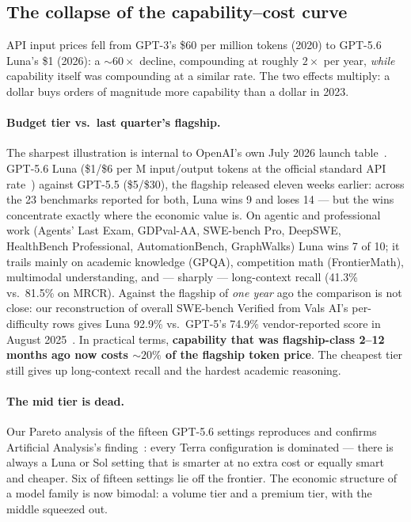 \documentclass[11pt]{article}
\begin{document}
\subsection{The collapse of the capability--cost curve}\label{sec:cost}

API input prices fell from GPT-3's \$60 per million tokens (2020) to GPT-5.6
Luna's \$1 (2026): a ${\sim}60\times$ decline,
compounding at roughly $2\times$ per year, \emph{while} capability itself
was compounding at a similar rate. The two effects multiply: a dollar buys
orders of magnitude more capability than a dollar in 2023.

\paragraph{Budget tier vs.\ last quarter's flagship.} The sharpest illustration
is internal to OpenAI's own July 2026 launch table~\cite{openai2026gpt56}.
GPT-5.6 Luna (\$1/\$6 per M input/output tokens at the official standard API
rate~\cite{openai2026gpt56}) against GPT-5.5 (\$5/\$30), the flagship released
eleven weeks earlier: across the 23 benchmarks reported for both, Luna wins 9
and loses 14 --- but the wins concentrate exactly where the economic value is.
On agentic and professional work (Agents' Last Exam, GDPval-AA, SWE-bench Pro,
DeepSWE, HealthBench Professional, AutomationBench, GraphWalks) Luna wins 7 of
10; it trails mainly on academic knowledge (GPQA), competition math
(FrontierMath), multimodal understanding, and --- sharply --- long-context
recall (41.3\% vs.\ 81.5\% on MRCR). Against the flagship of \emph{one year}
ago the comparison is not close: our reconstruction of overall SWE-bench
Verified from Vals AI's per-difficulty rows gives Luna 92.9\% vs.\ GPT-5's
74.9\% vendor-reported score in August
2025~\cite{vals2026swebench,localaimaster2026gpt55}. In practical terms,
\textbf{capability that was flagship-class 2--12 months ago now costs
${\sim}20\%$ of the flagship token price}. The cheapest tier still gives up
long-context recall and the hardest academic reasoning.

\paragraph{The mid tier is dead.} Our Pareto analysis of the fifteen
GPT-5.6 settings reproduces and confirms Artificial Analysis's
finding~\cite{gist2026aa56,aa2026gpt56}: every Terra configuration is dominated
--- there is always a Luna or Sol setting that is smarter at no extra cost or
equally smart and cheaper. Six of fifteen settings lie off the frontier. The
economic structure of a model family is now bimodal: a volume tier and a
premium tier, with the middle squeezed out.
\end{document}
